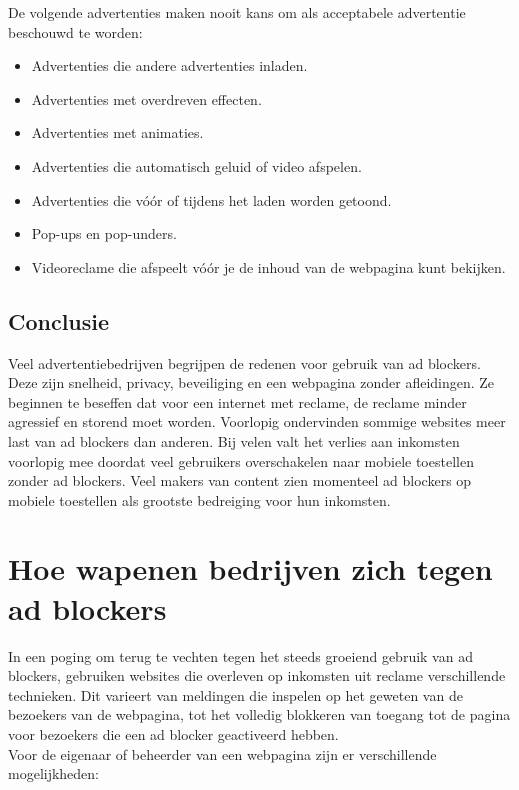 \documentclass[pdftex,a4paper,12pt,twoside]{report}
\begin{document}
De volgende advertenties maken nooit kans om als acceptabele advertentie beschouwd te worden:

\begin{itemize}
	\item Advertenties die andere advertenties inladen. 
	\item Advertenties met overdreven effecten.
	\item Advertenties met animaties.
	\item Advertenties die automatisch geluid of video afspelen.
	\item Advertenties die vóór of tijdens het laden worden getoond.
	\item Pop-ups en pop-unders.
	\item Videoreclame die afspeelt vóór je de inhoud van de webpagina kunt bekijken.
\end{itemize}

\section{Conclusie}
\label{sec Conclusie}
Veel advertentiebedrijven begrijpen de redenen voor gebruik van ad blockers. Deze zijn snelheid, privacy, beveiliging en een webpagina zonder afleidingen. Ze beginnen te beseffen dat voor een internet met reclame, de reclame minder agressief en storend moet worden. Voorlopig ondervinden sommige websites meer last van ad blockers dan anderen. Bij velen valt het verlies aan inkomsten voorlopig mee doordat veel gebruikers overschakelen naar mobiele toestellen zonder ad blockers. Veel makers van content zien momenteel ad blockers op mobiele toestellen als grootste bedreiging voor hun inkomsten.


\chapter{Hoe wapenen bedrijven zich tegen ad blockers}
\label{ch:Hoe wapenen bedrijven zich tegen ad blockers}
In een poging om terug te vechten tegen het steeds groeiend gebruik van ad blockers, gebruiken websites die overleven op inkomsten uit reclame verschillende technieken. Dit varieert van meldingen die inspelen op het geweten van de bezoekers van de webpagina, tot het volledig blokkeren van toegang tot de pagina voor bezoekers die een ad blocker geactiveerd hebben.
\\
Voor de eigenaar of beheerder van een webpagina zijn er verschillende mogelijkheden:
\end{document}
